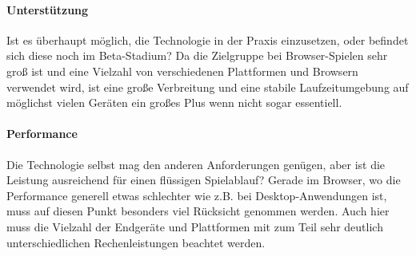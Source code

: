 \documentclass[a4paper, 12pt]{article}
\begin{document}
\paragraph{Unterstützung}
Ist es überhaupt möglich, die Technologie in der Praxis einzusetzen, oder befindet sich diese noch im Beta-Stadium? Da die Zielgruppe bei Browser-Spielen sehr groß ist und eine Vielzahl von verschiedenen Plattformen und Browsern verwendet wird, ist eine große Verbreitung und eine stabile Laufzeitumgebung auf möglichst vielen Geräten ein großes Plus wenn nicht sogar essentiell.
\paragraph{Performance}
Die Technologie selbst mag den anderen Anforderungen genügen, aber ist die Leistung ausreichend für einen flüssigen Spielablauf? Gerade im Browser, wo die Performance generell etwas schlechter wie z.B. bei Desktop-Anwendungen ist, muss auf diesen Punkt besonders viel Rücksicht genommen werden. Auch hier muss die Vielzahl der Endgeräte und Plattformen mit zum Teil sehr deutlich unterschiedlichen Rechenleistungen beachtet werden.
\end{document}

